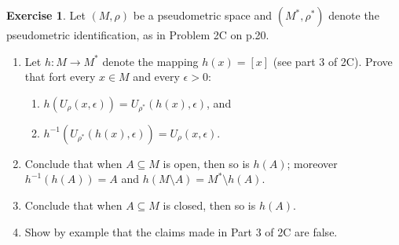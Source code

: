 \documentclass[12pt]{extarticle}
\newcommand{\<}{\langle}
\renewcommand{\>}{\rangle}
\theoremstyle{definition}
\newtheorem{exercise}{Exercise}
\begin{document}
\begin{exercise}
  Let $(M, \rho)$ be a pseudometric space and $(M^*, \rho^*)$ denote the pseudometric identification, as in Problem 2C on p.20.

  \begin{enumerate}
  \item
    Let  $h: M \to M^*$ denote the mapping $h(x) = [x]$ (see part 3 of 2C). Prove that fort every $ x \in M$ and every $\epsilon > 0$:
    \begin{enumerate}
    \item
      $h(U_{\rho}(x, \epsilon)) = U_{\rho^*} (h(x), \epsilon)$, and 
    \item
      $h^{-1}(U_{\rho^*}(h(x), \epsilon)) = U_{\rho}(x, \epsilon)$.
    \end{enumerate}
  \item
    Conclude that  when $A \subseteq M$ is open, then so is $h(A)$; moreover $h^{-1}(h(A)) = A$ and $h (M \setminus A) = M^* \setminus h(A)$.
  \item
    Conclude that when $A \subseteq M$ is closed, then so is $h(A)$.
  \item
    Show by example that the claims made in Part 3 of 2C are false. 
  \end{enumerate}
\end{exercise}
\end{document}
